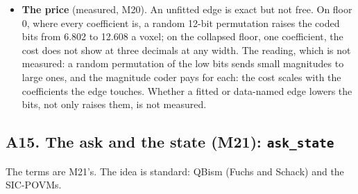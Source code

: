 \begin{itemize}
\item \textbf{The price} (measured, M20). An unfitted edge is exact but not free. On floor 0, where every coefficient is, a random 12-bit permutation raises the coded bits from 6.802 to 12.608 a voxel; on the collapsed floor, one coefficient, the cost does not show at three decimals at any width. The reading, which is not measured: a random permutation of the low bits sends small magnitudes to large ones, and the magnitude coder pays for each: the cost scales with the coefficients the edge touches. Whether a fitted or data-named edge lowers the bits, not only raises them, is not measured.
\end{itemize}

\subsection{\texorpdfstring{A15. The ask and the state (M21): \texttt{ask\_\allowbreak{}state}}{A15. The ask and the state (M21): ask\_state}}

The terms are M21's. The idea is standard: QBism (Fuchs and Schack) and the SIC-POVMs.

